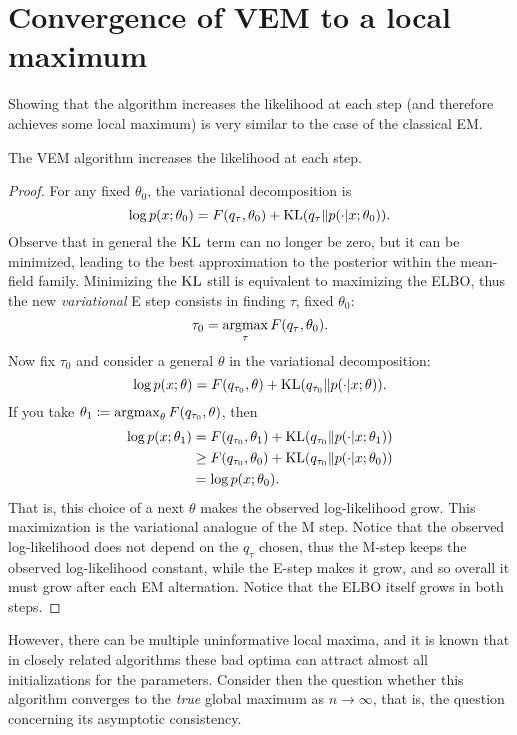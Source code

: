 \documentclass[../../main.tex]{subfiles} %
\begin{document}
\section{Convergence of VEM to a local 
maximum}
\label{app:em-monotone}
Showing that the algorithm increases the likelihood at each step (and therefore 
achieves some local maximum) is very similar to the case of the classical EM.

\begin{proposition}
	The VEM algorithm increases the likelihood at each step.
\end{proposition}

\begin{proof}
	For any fixed \(\theta_0\), the variational decomposition is
	\begin{equation}
		\log p(x; \theta_0) = F(q_\tau, \theta_0) + \operatorname{KL} (q_\tau \Vert p(\cdot 
		\vert 
		x; \theta_0)).
	\end{equation}
	Observe that in general the \(\operatorname{KL}\) term can no longer be zero, but it can be 
	minimized, leading to the best approximation to the posterior within the 
	mean-field family. Minimizing the \(\operatorname{KL}\) still is equivalent to maximizing 
	the ELBO, thus the new \textit{variational} E step consists in finding 
	\(\tau\), 
	fixed \(\theta_0\):
	\begin{equation}
		\tau_0 = \operatorname*{argmax}_\tau F (q_\tau, \theta_0).
	\end{equation}
	Now fix \(\tau_0\) and consider a general \(\theta\) in the variational 
	decomposition:
	\begin{equation*}
		\log p(x; \theta) = F(q_{\tau_0}, \theta) + \operatorname{KL} (q_{\tau_0} \Vert 
		p(\cdot 
		\vert x; \theta)).
	\end{equation*}
	If you take \(\theta_1 \coloneqq \operatorname*{argmax}_\theta F (q_{\tau_0}, \theta)\), 
	then
	\begin{align*}
		\log p(x; \theta_1) &= F(q_{\tau_0}, \theta_1) + \operatorname{KL} (q_{\tau_0} \Vert 
		p(\cdot \vert x; \theta_1)) \\
		&\geq F(q_{\tau_0}, \theta_0) + \operatorname{KL} (q_{\tau_0} \Vert p(\cdot \vert x; 
		\theta_0)) \\
		&= \log p(x; \theta_0).
	\end{align*}
	That is, this choice of a next \(\theta\) makes the observed log-likelihood 
	grow. This maximization is the variational analogue of the M step. Notice 
	that the observed log-likelihood does not depend on the \(q_\tau\) chosen, 
	thus the M-step keeps the observed log-likelihood constant, while the E-step 
	makes it grow, and so overall it must grow after each EM alternation. Notice 
	that the ELBO itself grows in both steps.
\end{proof}

However, there can be multiple uninformative local maxima, and it is known 
\cite{sarkar_when_2021} that in closely related algorithms these bad optima can 
attract almost all initializations for the parameters. Consider then the 
question whether this algorithm converges to the \textit{true} global maximum 
as \(n \to \infty\), that is, the question concerning its asymptotic 
consistency.
\end{document}
